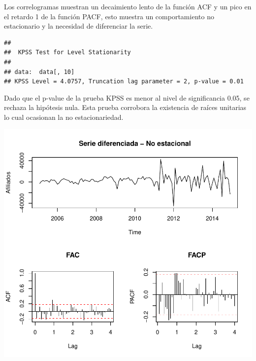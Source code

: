\documentclass[11pt,a4paper,oneside]{article}\usepackage[]{graphicx}\usepackage[]{color}
\makeatletter
\def\maxwidth{ %
  \ifdim\Gin@nat@width>\linewidth
    \linewidth
  \else
    \Gin@nat@width
  \fi
}
\newenvironment{kframe}{%
 \def\at@end@of@kframe{}%
 \ifinner\ifhmode%
  \def\at@end@of@kframe{\end{minipage}}%
  \begin{minipage}{\columnwidth}%
 \fi\fi%
 \def\FrameCommand##1{\hskip\@totalleftmargin \hskip-\fboxsep
 \colorbox{shadecolor}{##1}\hskip-\fboxsep
     \hskip-\linewidth \hskip-\@totalleftmargin \hskip\columnwidth}%
 \MakeFramed {\advance\hsize-\width
   \@totalleftmargin\z@ \linewidth\hsize
   \@setminipage}}%
 {\par\unskip\endMakeFramed%
 \at@end@of@kframe}
\newenvironment{knitrout}{}{} %
\makeatother
\begin{document}
Los correlogramas muestran un decaimiento lento de la función ACF y un pico en el retardo 1 de la función PACF, esto muestra un comportamiento no estacionario y la necesidad de diferenciar la serie.

\begin{knitrout}
\color{fgcolor}\begin{kframe}
\begin{verbatim}
## 
## 	KPSS Test for Level Stationarity
## 
## data:  data[, 10]
## KPSS Level = 4.0757, Truncation lag parameter = 2, p-value = 0.01
\end{verbatim}
\end{kframe}
\end{knitrout}

Dado que el p-value de la prueba KPSS es menor al nivel de significancia 0.05, se rechaza la hipótesis nula. Esta prueba corrobora la existencia de raíces unitarias lo cual ocasionan la no estacionariedad.

\begin{knitrout}
\color{fgcolor}

{\centering \includegraphics[width=\maxwidth]{figure/unnamed-chunk-4-1} 

}



\end{knitrout}
\end{document}
